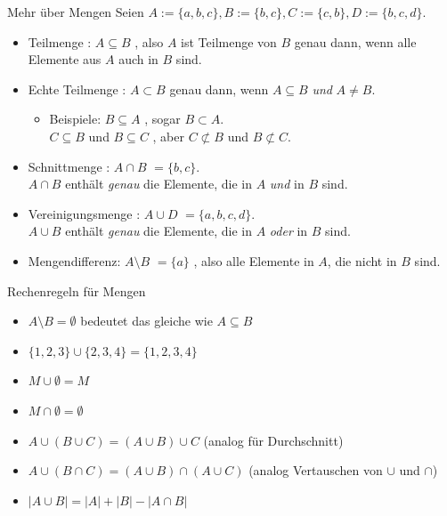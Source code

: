 \documentclass{beamer}
\begin{document}
\begin{frame}{Mehr über Mengen}
	  Seien $A := \{a, b, c\}, B:= \{b, c\}, C:= \{c, b\}, D := \{b, c, d\}$.
	
	\begin{itemize}
		\item Teilmenge  : $A \subseteq B$  , also $A$ ist Teilmenge von $B$   genau dann, wenn alle Elemente aus $A$ auch in $B$ sind.
		\item Echte Teilmenge  : $A \subset B$   genau dann, wenn $A \subseteq B$   \emph{und} $A \neq B$.
		\begin{itemize}
			\item Beispiele:   $B \subseteq A$  , sogar $B \subset A$.\\   $C \subseteq B$   und $B \subseteq C$  , aber $C \not\subset B$ und $B \not\subset C$.
		\end{itemize}
		\item Schnittmenge  : $A \cap B$   $ = \{b, c\}$.  \\ $A \cap B$ enthält \emph{genau} die Elemente, die in $A$ \emph{und} in $B$ sind.%
		\item Vereinigungsmenge  : $A \cup D$   $ = \{a, b, c, d\}$.  \\ $A \cup B$ enthält \emph{genau} die Elemente, die in $A$ \emph{oder} in $B$ sind.
		\item Mengendifferenz:   $A \setminus B$   $ = \{a\}$  , also alle Elemente in $A$, die nicht in $B$ sind.  
	\end{itemize}
\end{frame}

\begin{frame}{Rechenregeln für Mengen}
	\begin{itemize}
			\item $A \setminus B = \emptyset$  bedeutet das gleiche wie $A \subseteq B$
			\item $ \{1, 2, 3\} \cup \{2, 3, 4\} = \{1, 2, 3, 4\}$
			\item $ M \cup \emptyset = M $
			\item $ M \cap \emptyset = \emptyset $
			\item $ A \cup (B \cup C) = (A \cup B) \cup C $ (analog für Durchschnitt)
			\item $ A \cup (B \cap C) = (A \cup B) \cap (A \cup C) $ (analog Vertauschen von $\cup$ und $\cap$)
			\item $|A \cup B| = |A| + |B| - |A \cap B|$
	\end{itemize}
\end{frame}
\end{document}
